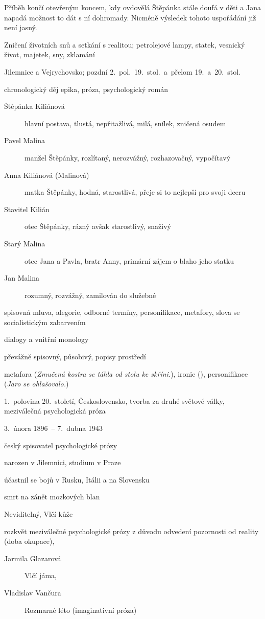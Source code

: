 {Příběh končí otevřeným koncem, kdy ovdovělá Štěpánka stále doufá v děti a Jana
napadá možnost to dát s ní dohromady. Nicméně výsledek tohoto uspořádání již
není jasný.

 Zničení životních snů a setkání s realitou; petrolejové
lampy, statek, vesnický život, majetek, sny, zklamání

 Jilemnice a Vejrychovsko; pozdní 2.~pol.~19.~stol.~a~přelom
19.~a~20.~stol.

 chronologický děj
 epika, próza, psychologický román

\newpart

\begin{description}
	\item[Štěpánka Kiliánová] hlavní postava, tlustá, nepřitažlivá, milá,
		snílek, zničená osudem
	\item[Pavel Malina] manžel Štěpánky, rozlítaný, nerozvážný, rozhazovačný,
		vypočítavý
	\item[Anna Kiliánová (Malinová)] matka Štěpánky, hodná, starostlivá, přeje
		si to nejlepší pro svoji dceru
	\item[Stavitel Kilián] otec Štěpánky, rázný avšak starostlivý, snaživý
	\item[Starý Malina] otec Jana a Pavla, bratr Anny, primární zájem o blaho
		jeho statku
	\item[Jan Malina] rozumný, rozvážný, zamilován do služebné
\end{description}

spisovná mluva, alegorie, odborné termíny, personifikace, metafory,
slova se socialistickým zabarvením

 dialogy a vnitřní monology

\newpart

převážně spisovný, působivý, popisy prostředí

 metafora (\textit{Zmučená kostra se
táhla od stolu ke skříni.}), ironie (\textit{}), personifikace (\textit{Jaro se ohlašovalo.})

 1.~polovina 20.~století, Československo, tvorba
za druhé světové války, meziválečná psychologická próza

\begin{compactitem}
	\item 3.~února 1896~-- 7.~dubna 1943
	\item český spisovatel psychologické prózy
	\item narozen v Jilemnici, studium v Praze
	\item účastnil se bojů v Rusku, Itálii a na Slovensku
	\item smrt na zánět mozkových blan
	\item Neviditelný, Vlčí kůže
\end{compactitem}

rozkvět meziválečné psychologické prózy z důvodu odvedení pozornosti od reality (doba okupace),
\begin{description}
	\item[Jarmila Glazarová] Vlčí jáma,
	\item[Vladislav Vančura] Rozmarné léto (imaginativní próza)
\end{description}
}

